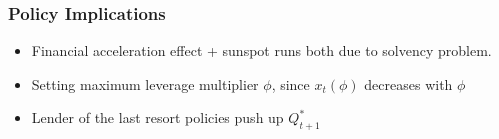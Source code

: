 \begin{frame}
    \frametitle{Policy Implications}

    \begin{itemize}
        \item Financial acceleration effect + sunspot runs both due to solvency problem.
        \item Setting maximum leverage multiplier $\phi$, since $x_t(\phi)$ decreases with $\phi$
        \item Lender of the last resort policies push up $Q^*_{t+1}$
    \end{itemize}

\end{frame}